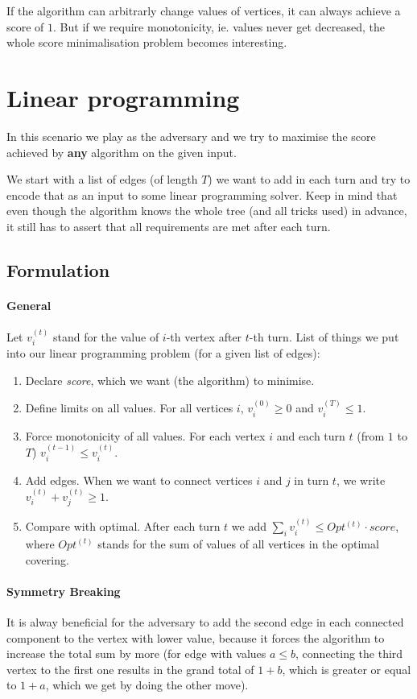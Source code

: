 \documentclass[12pt, A4]{article}
\begin{document}
If the algorithm can arbitrarly change values of vertices, it can always achieve a score of $1$. But if we require monotonicity, ie. values never get decreased, the whole score minimalisation problem becomes interesting.



\section{Linear programming}
In this scenario we play as the adversary and we try to maximise the score achieved by \textbf{any} algorithm on the given input.

We start with a list of edges (of length $T$) we want to add in each turn and try to encode that as an input to some linear programming solver. Keep in mind that even though the algorithm knows the whole tree (and all tricks used) in advance, it still has to assert that all requirements are met after each turn.


\subsection{Formulation}
\paragraph{General}
Let $v_i^{(t)}$ stand for the value of $i$-th vertex after $t$-th turn. List of things we put into our linear programming problem (for a given list of edges):
\begin{enumerate}
    \item Declare \textit{score}, which we want (the algorithm) to minimise.
    \item Define limits on all values. For all vertices $i$, $v_i^{(0)} \ge 0$ and $v_i^{(T)} \le 1$.
    \item Force monotonicity of all values. For each vertex $i$ and each turn $t$ (from $1$ to $T$) $v_i^{(t-1)} \le v_i^{(t)}$.
    \item Add edges. When we want to connect vertices $i$ and $j$ in turn $t$, we write $v_i^{(t)} + v_j^{(t)} \ge 1$.
    \item Compare with optimal. After each turn $t$ we add $\sum_{i} v_i^{(t)} \le Opt^{(t)} \cdot \textit{score}$, where $Opt^{(t)}$ stands for the sum of values of all vertices in the optimal covering.
\end{enumerate}


\paragraph{Symmetry Breaking}
It is alway beneficial for the adversary to add the second edge in each connected component to the vertex with lower value, because it forces the algorithm to increase the total sum by more (for edge with values $a \le b$, connecting the third vertex to the first one results in the grand total of $1 + b$, which is greater or equal to $1 + a$, which we get by doing the other move).
\end{document}
